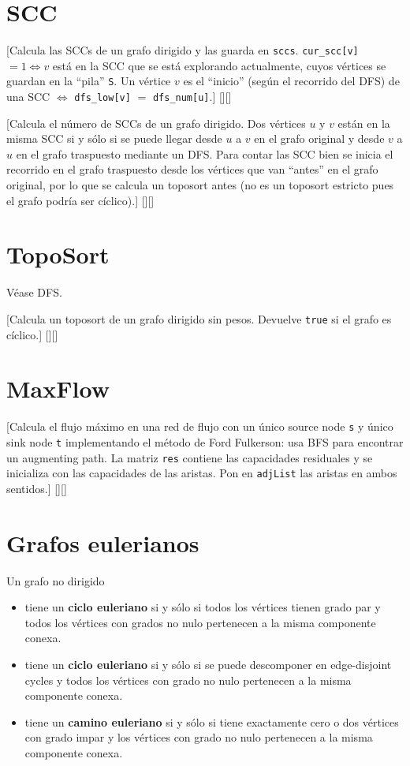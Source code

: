 \section{SCC}
	[Calcula las SCCs de un grafo dirigido y las guarda en \texttt{sccs}. \texttt{cur\_scc[v]} $= 1 \iff v$ está en la SCC que se está explorando actualmente, cuyos vértices se guardan en la ``pila'' \texttt{S}. Un vértice $v$ es el ``inicio'' (según el recorrido del DFS) de una SCC $\iff$ \texttt{dfs\_low[v]} $=$ \texttt{dfs\_num[u]}.]%
	[][]
	
	[Calcula el número de SCCs de un grafo dirigido. Dos vértices $u$ y $v$ están en la misma SCC si y sólo si se puede llegar desde $u$ a $v$ en el grafo original y desde $v$ a $u$ en el grafo traspuesto mediante un DFS. Para contar las SCC bien se inicia el recorrido en el grafo traspuesto desde los vértices que van ``antes'' en el grafo original, por lo que se calcula un toposort antes (no es un toposort estricto pues el grafo podría ser cíclico).]%
	[][]

\section{TopoSort}

	Véase DFS.

	[Calcula un toposort de un grafo dirigido sin pesos. Devuelve \texttt{true} si el grafo es cíclico.]%
	[][]

\section{MaxFlow}
	[Calcula el flujo máximo en una red de flujo con un único source node \texttt{s} y único sink node \texttt{t} implementando el método de Ford Fulkerson: usa BFS para encontrar un augmenting path. La matriz \texttt{res} contiene las capacidades residuales y se inicializa con las capacidades de las aristas. Pon en \texttt{adjList} las aristas en ambos sentidos.]%
	[][]

\section{Grafos eulerianos}

	Un grafo no dirigido
	\begin{itemize}
		\item tiene un \textbf{ciclo euleriano} si y sólo si todos los vértices tienen grado par y todos los vértices con grados no nulo pertenecen a la misma componente conexa.
		\item tiene un \textbf{ciclo euleriano} si y sólo si se puede descomponer en edge-disjoint cycles y todos los vértices con grado no nulo pertenecen a la misma componente conexa.
		\item tiene un \textbf{camino euleriano} si y sólo si tiene exactamente cero o dos vértices con grado impar y los vértices con grado no nulo pertenecen a la misma componente conexa.
	\end{itemize}

